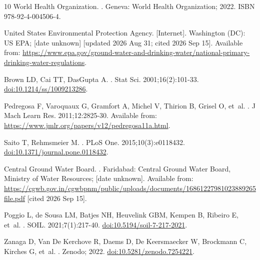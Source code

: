 \documentclass[10pt,letterpaper]{article}
\begin{document}
\begin{thebibliography}{10}
{World Health Organization}.
.
\newblock Geneva: World Health Organization; 2022.
\newblock ISBN 978-92-4-004506-4.

{United States Environmental Protection Agency}.
 [Internet]. Washington
  (DC): US EPA; [date unknown] [updated 2026 Aug 31; cited 2026 Sep 15].
\newblock Available from:
  \url{https://www.epa.gov/ground-water-and-drinking-water/national-primary-drinking-water-regulations}.

{Brown} LD, {Cai} TT, {DasGupta} A.
.
\newblock Stat Sci. 2001;16(2):101-33.
\newblock \href {http://dx.doi.org/10.1214/ss/1009213286}
  {doi:10.1214/ss/1009213286}.

{Pedregosa} F, {Varoquaux} G, {Gramfort} A, {Michel} V, {Thirion} B, {Grisel}
  O, et~al.
.
\newblock J Mach Learn Res. 2011;12:2825-30.
\newblock Available from:
  \url{https://www.jmlr.org/papers/v12/pedregosa11a.html}.

{Saito} T, {Rehmsmeier} M.
.
\newblock PLoS One. 2015;10(3):e0118432.
\newblock \href {http://dx.doi.org/10.1371/journal.pone.0118432}
  {doi:10.1371/journal.pone.0118432}.

{Central Ground Water Board}.
.
\newblock Faridabad: Central Ground Water Board, Ministry of Water Resources;
  [date unknown].
\newblock Available from:
  \url{https://cgwb.gov.in/cgwbpnm/public/uploads/documents/16861227981023889265file.pdf}
  [cited 2026 Sep 15].

{Poggio} L, {de Sousa} LM, {Batjes} NH, {Heuvelink} GBM, {Kempen} B, {Ribeiro}
  E, et~al.
.
\newblock SOIL. 2021;7(1):217-40.
\newblock \href {http://dx.doi.org/10.5194/soil-7-217-2021}
  {doi:10.5194/soil-7-217-2021}.

{Zanaga} D, {Van De Kerchove} R, {Daems} D, {De Keersmaecker} W, {Brockmann} C,
  {Kirches} G, et~al.
.
\newblock Zenodo; 2022.
\newblock \href {http://dx.doi.org/10.5281/zenodo.7254221}
  {doi:10.5281/zenodo.7254221}.


\end{thebibliography}
\end{document}
